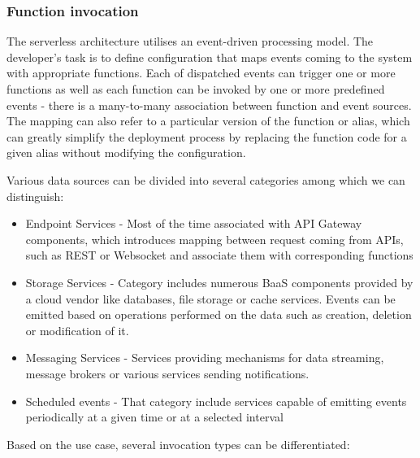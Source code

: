\subsubsection*{Function invocation}

The serverless architecture utilises an event-driven processing model. The developer's task is to define configuration that maps events coming to the system with appropriate functions. Each of dispatched events can trigger one or more functions as well as each function can be invoked by one or more predefined events - there is a many-to-many association between function and event sources. The mapping can also refer to a particular version of the function or alias, which can greatly simplify the deployment process by replacing the function code for a given alias without modifying the configuration.

Various data sources can be divided into several categories among which we can distinguish:

\begin{itemize}
    \item Endpoint Services - Most of the time associated with API Gateway components, which introduces mapping between request coming from APIs, such as REST or Websocket and associate them with corresponding functions
    \item Storage Services - Category includes numerous BaaS components provided by a cloud vendor like databases, file storage or cache services. Events can be emitted based on operations performed on the data such as creation, deletion or modification of it.
    \item Messaging Services - Services providing mechanisms for data streaming, message brokers or various services sending notifications.
    \item Scheduled events - That category include services capable of emitting events periodically at a given time or at a selected interval
\end{itemize}

Based on the use case, several invocation types can be differentiated:


